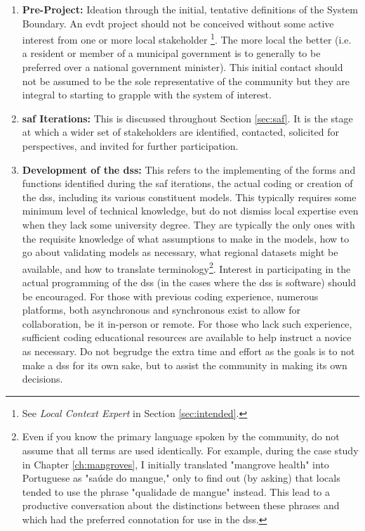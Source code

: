 \begin{enumerate} \setlength{\itemsep}{0pt} \setlength{\parskip}{0pt}
    \item{\textbf{Pre-Project:} Ideation through the initial, tentative definitions of the System Boundary. An \ac{evdt} project should not be conceived without some active interest from one or more local stakeholder \footnote{See \textit{Local Context Expert} in Section \ref{sec:intended}.}.  The more local the better (i.e. a resident or member of a municipal government is to generally to be preferred over a national government minister). This initial contact should not be assumed to be the sole representative of the community but they are integral to starting to grapple with the system of interest.}
	\item{\textbf{\ac{saf} Iterations:} This is discussed throughout Section \ref{sec:saf}. It is the stage at which a wider set of stakeholders are identified, contacted, solicited for perspectives, and invited for further participation.}
	\item{\textbf{Development of the \ac{dss}:} This refers to the implementing of the forms and functions identified during the \ac{saf} iterations, the actual coding or creation of the \ac{dss}, including its various constituent models. This typically requires some minimum level of technical knowledge, but do not dismiss local expertise even when they lack some university degree. They are typically the only ones with the requisite knowledge of what assumptions to make in the models, how to go about validating models as necessary, what regional datasets might be available, and how to translate terminology\footnote{Even if you know the primary language spoken by the community, do not assume that all terms are used identically. For example, during the case study in Chapter \ref{ch:mangroves}, I initially translated "mangrove health" into Portuguese as "saúde do mangue," only to find out (by asking) that locals tended to use the phrase "qualidade de mangue" instead. This lead to a productive conversation about the distinctions between these phrases and which had the preferred connotation for use in the \ac{dss}.}. Interest in participating in the actual programming of the \ac{dss} (in the cases where the \ac{dss} is software) should be encouraged. For those with previous coding experience, numerous platforms, both asynchronous and synchronous exist to allow for collaboration, be it in-person or remote. For those who lack such experience, sufficient coding educational resources are available to help instruct a novice as necessary. Do not begrudge the extra time and effort as the goals is to not make a \ac{dss} for its own sake, but to assist the community in making its own decisions.}

\end{enumerate}
